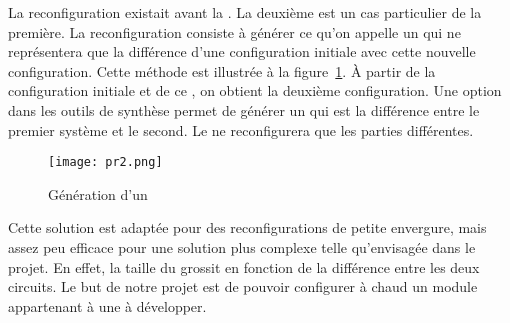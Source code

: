 La reconfiguration  existait avant la . La deuxième est un cas particulier de la première. La reconfiguration  consiste à générer ce qu'on appelle un  qui ne représentera que la différence d'une configuration initiale avec cette nouvelle configuration. Cette méthode est illustrée à la figure~\ref{partial-bitstream}. À partir de la configuration initiale et de ce , on obtient la deuxième configuration. Une option dans les outils de synthèse  permet de générer un  qui est la différence entre le premier système et le second. Le \fpga{} ne reconfigurera que les parties différentes.\\
\begin{figure}[h!]
\centering
\texttt{[image: pr2.png]}
\caption{Génération d'un }
\label{partial-bitstream}
\end{figure}
Cette solution est adaptée pour des reconfigurations de petite envergure, mais assez peu efficace pour une solution plus complexe telle qu'envisagée dans le projet. En effet, la taille du  grossit en fonction de la différence entre les deux circuits. Le but de notre projet est de pouvoir configurer à chaud un module appartenant à une  à développer.\\

